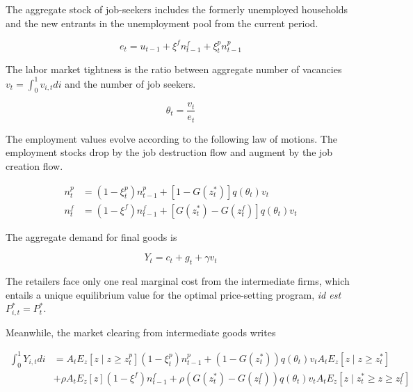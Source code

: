 \documentclass[a4paper]{article}
\begin{document}
The aggregate stock of job-seekers includes the formerly unemployed households and the new entrants in the unemployment pool from the current period.

\begin{equation}
e_t = u_{t-1} + \xi^f n_{t-1}^f + \xi_t^p n_{t-1}^p
\end{equation}

The labor market tightness is the ratio between aggregate number of vacancies $v_t = \int_{0}^{1} v_{i,t} di$ and the number of job seekers.

\begin{equation*}
\theta_t = \frac{v_t}{e_t}
\end{equation*}

The employment values evolve according to the following law of motions. The employment stocks drop by the job destruction flow and augment by the job creation flow.

\begin{align}
n_t^p &= \left( 1 - \xi_t^p \right) n_{t-1}^p + \left[ 1-G\left( z_t^*\right)\right]q\left(\theta_t\right) v_t\\
n_t^f &= \left( 1 - \xi^f \right) n_{t-1}^f + \left[ G\left( z_t^*\right)-G\left( z_t^f\right)\right]q\left(\theta_t\right) v_t
\end{align}

The aggregate demand for final goods is

\begin{equation}
Y_t = c_t + g_t + \gamma v_t \label{res_cons}
\end{equation}


The retailers face only one real marginal cost from the intermediate firms, which entails a unique equilibrium value for the optimal price-setting program, \emph{id est} $P_{i,t}^* = P_t^*$.

Meanwhile, the market clearing from intermediate goods writes

\begin{align*}
\int_{0}^{1} Y_{i,t} di &= A_t E_z \left[z \mid z \geq z_t^p \right] \left( 1 - \xi_t^p \right) n_{t-1}^p + \left( 1 - G\left( z_t^* \right)\right) q \left( \theta_t \right) v_t A_t E_z \left[z \mid z \geq z_t^* \right]\\
&+ \rho A_t E_z \left[ z \right] \left( 1 - \xi^f \right) n_{t-1}^f + \rho \left( G\left( z_t^* \right) - G\left( z_t^f \right)\right) q \left( \theta_t \right) v_t A_t E_z \left[z \mid z_t^* \geq z \geq z_t^f \right]
\end{align*}
\end{document}
